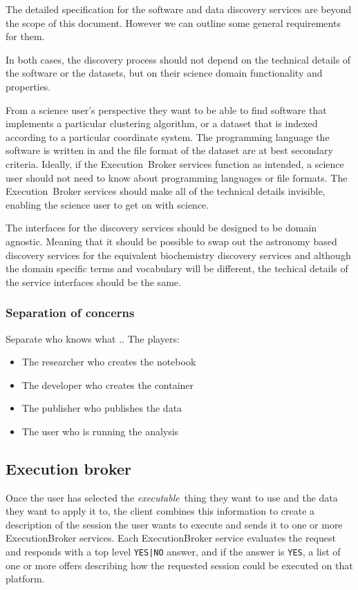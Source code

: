 \documentclass[11pt,a4paper]{ivoa}
\newcommand{\execbrokerclass} {ExecutionBroker}
\newcommand{\executionbroker} {Execution~Broker}
\newcommand{\codeword}[1] {\texttt{#1}}
\newcommand{\dataset} {dataset}
\newcommand{\executablething} {\textit{executable}~thing}
\begin{document}
The detailed specification for the software and data discovery services are beyond the
scope of this document.
However we can outline some general requirements for them.

In both cases, the discovery process should not depend on the technical details
of the software or the \dataset{}s, but on their science domain functionality and properties.

From a science user's perspective they want to be able to find software that implements
a particular clustering algorithm, or a \dataset{} that is indexed according to a particular
coordinate system.
The programming language the software is written in and the file format of the \dataset{}
are at best secondary criteria.
Ideally, if the \executionbroker{} services function as intended, a science user should not
need to know about programming languages or file formats.
The \executionbroker{} services should make all of the technical details invisible,
enabling the science user to get on with science.

The interfaces for the discovery services should be designed to be domain agnostic.
Meaning that it should be possible to swap out the astronomy based discovery services
for the equivalent biochemistry discovery services and although the domain specific
terms and vocabulary will be different, the techical details of the service interfaces
should be the same.

\subsubsection{Separation of concerns}
\label{separate-concerns}

Separate who knows what ..
The players:
\begin{itemize}
    \item The researcher who creates the notebook
    \item The developer who creates the container
    \item The publisher who publishes the data
    \item The user who is running the analysis
\end{itemize}

\subsection{Execution broker}
\label{execution-broker-desc}

Once the user has selected the \executablething{} they want to use and the
data they want to apply it to, the client combines this information to create a
description of the session the user wants to execute and sends it to one or more
\execbrokerclass{} services.
Each \execbrokerclass{} service evaluates the request and responds with a top level
\codeword{YES|NO} answer, and if
the answer is \codeword{YES}, a list of one or more offers describing how
the requested session could be executed on that platform.
\end{document}
